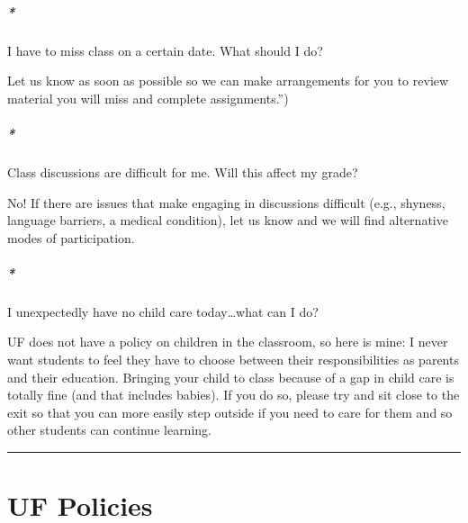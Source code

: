\documentclass[
  10pt,
  letterpaper,
  oneside,
  open=any]{scrbook}
\let\oldparagraph\paragraph
\renewcommand{\paragraph}[1]{\oldparagraph{#1}\mbox{}}
\begin{document}
\paragraph*{I have to miss class on a certain date. What should I
do?}\label{i-have-to-miss-class-on-a-certain-date.-what-should-i-do}

Let us know as soon as possible so we can make arrangements for you to
review material you will miss and complete assignments.'')

\paragraph*{Class discussions are difficult for me. Will this affect my
grade?}\label{class-discussions-are-difficult-for-me.-will-this-affect-my-grade}

No! If there are issues that make engaging in discussions difficult
(e.g., shyness, language barriers, a medical condition), let us know and
we will find alternative modes of participation.

\paragraph*{I unexpectedly have no child care today\ldots what can I
do?}\label{i-unexpectedly-have-no-child-care-todaywhat-can-i-do}

UF does not have a policy on children in the classroom, so here is mine:
I never want students to feel they have to choose between their
responsibilities as parents and their education. Bringing your child to
class because of a gap in child care is totally fine (and that includes
babies). If you do so, please try and sit close to the exit so that you
can more easily step outside if you need to care for them and so other
students can continue learning.

\begin{center}\rule{0.5\linewidth}{0.5pt}\end{center}


\chapter{UF Policies}\label{uf-policies}
\end{document}
